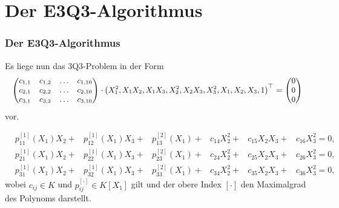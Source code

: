 \documentclass[11pt]{beamer}
\theoremstyle{custom}
\theoremstyle{custom}
\begin{document}
	\section{Der E3Q3-Algorithmus}
	\begin{frame}
		\frametitle{Der E3Q3-Algorithmus}
		\pause
		Es liege nun das 3Q3-Problem in der Form
		\begin{equation*}
			\small
			\begin{pmatrix}
				c_{1,1}&c_{1,2}&\ldots&c_{1,10}\\
				c_{2,1}&c_{2,2}&\ldots&c_{2,10}\\
				c_{3,1}&c_{3,2}&\ldots&c_{3,10}\\
			\end{pmatrix} \cdot
			\begin{pmatrix}
				X_{1}^{2},X_{1}X_{2},X_{1}X_{3},X_{2}^{2},X_{2}X_{3},X_{3}^{2},X_{1},X_{2},X_{3},1
			\end{pmatrix}^\top =  \begin{pmatrix}
				0\\0\\0
			\end{pmatrix}
		\end{equation*}
		vor.\\
	\end{frame}
	\begin{frame}
		\begin{equation}\label{eqn:E3Q3}
			\begin{alignedat}{6}
				&p_{11}^{\left[1\right] }\left(X_{1}\right)X_{2}+
				&p_{12}^{\left[1\right] }\left(X_{1}\right)X_{3}+
				&p_{13}^{\left[2\right] }\left(X_{1}\right)+
				&c_{14}X_{2}^2+&c_{15}X_{2}X_{3}+&c_{16}X_{3}^2=0,\\
				&p_{21}^{\left[1\right] }\left(X_{1}\right)X_{2}+
				&p_{22}^{\left[1\right] }\left(X_{1}\right)X_{3}+
				&p_{23}^{\left[2\right] }\left(X_{1}\right)+
				&c_{24}X_{2}^2+&c_{25}X_{2}X_{3}+&c_{26}X_{3}^2=0,\\
				&p_{31}^{\left[1\right] }\left(X_{1}\right)X_{2}+
				&p_{32}^{\left[1\right] }\left(X_{1}\right)X_{3}+
				&p_{33}^{\left[2\right] }\left(X_{1}\right)+
				&c_{34}X_{2}^2+&c_{35}X_{2}X_{3}+&c_{36}X_{3}^2=0,
			\end{alignedat}
		\end{equation}
		wobei $c_{ij} \in K$ und $p_{ij}^{\left[\cdot \right] } \in K\left[ X_{1}\right]$ gilt und der obere Index $\left[\cdot \right]$ den Maximalgrad des Polynoms darstellt.
	\end{frame}
\end{document}
